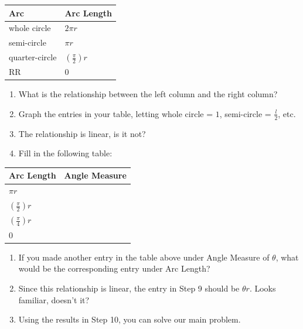 \documentclass[english]{book}
\begin{document}
\begin{center}
\begin{table}[htbp]
\begin{center}
\begin{tabular}{|l|l|}
  \hline 
  Arc            &  Arc Length \\
  \hline 
  whole circle   & $2 \pi r$ \\
  semi-circle    & $\pi r$ \\
  quarter-circle & $(\frac{\pi}{2})r$ \\
  RR             & $0$ \\
\hline
\end{tabular}
\label{tbl7.13hint1}
\end{center}
\end{table}
\end{center}

\begin{enumerate}
  \item[\hspace{1cm}5)] What is the relationship between the left column and the right column?
  \item[\hspace{1cm}6)] Graph the entries in your table, letting whole circle = $1$, semi-circle = $\frac{l}{2}$, etc.
  \item[\hspace{1cm}7)] The relationship is linear, is it not?
  \item[\hspace{1cm}8)] Fill in the following table:
\end{enumerate}

\begin{center}
\begin{table}[htbp]
\begin{center}
\begin{tabular}{|l|l|}
  \hline 
  Arc Length         &  Angle Measure \\
  \hline 
  $\pi r$            &  \\
  $(\frac{\pi}{2})r$ &  \\ 
  $(\frac{\pi}{4})r$ &  \\
  $0$                &  \\
  \hline
\end{tabular}
\label{tbl7.13hint2}
\end{center}
\end{table}
\end{center}

\begin{enumerate}
  \item[\hspace{1cm}9)] If you made another entry in the table above under Angle Measure of $\theta$, what would be the corresponding entry under Arc Length?
  \item[\hspace{1cm}10)] Since this relationship is linear, the entry in Step 9 should be $\theta r$. Looks familiar, doesn't it?
  \item[\hspace{1cm}11)] Using the results in Step 10, you can solve our main problem.
\end{enumerate}
\end{document}

